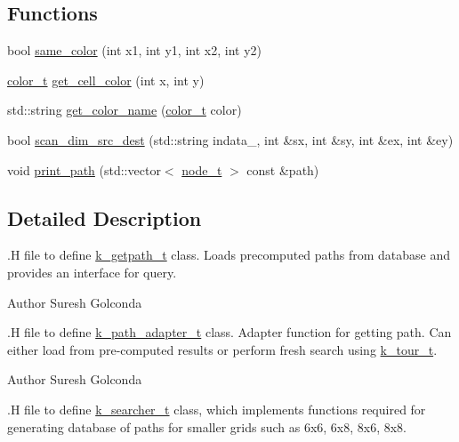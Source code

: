 \subsection*{\-Functions}
\begin{DoxyCompactItemize}
\item 
bool \hyperlink{namespaceknight__path__t_a43c9781d6e418e7a744ca04c5b1ee4c8}{same\-\_\-color} (int x1, int y1, int x2, int y2)
\item 
\hyperlink{namespaceknight__path__t_a0a9ffd13fa55164ea2147a92e4cf1d9d}{color\-\_\-t} \hyperlink{namespaceknight__path__t_a9f9a2b3586f04e4fb11b282d6ad9c3e5}{get\-\_\-cell\-\_\-color} (int x, int y)
\item 
std\-::string \hyperlink{namespaceknight__path__t_a7b62e81ce7b081406f94019c8863dc90}{get\-\_\-color\-\_\-name} (\hyperlink{namespaceknight__path__t_a0a9ffd13fa55164ea2147a92e4cf1d9d}{color\-\_\-t} color)
\item 
bool \hyperlink{namespaceknight__path__t_aae1cfdfd5ea3ff57eab91c245deaa25c}{scan\-\_\-dim\-\_\-src\-\_\-dest} (std\-::string indata\-\_\-, int \&sx, int \&sy, int \&ex, int \&ey)
\item 
void \hyperlink{namespaceknight__path__t_a38964814d6470650a9b5c8c26f3e401b}{print\-\_\-path} (std\-::vector$<$ \hyperlink{structknight__path__t_1_1node__t}{node\-\_\-t} $>$ const \&path)
\end{DoxyCompactItemize}


\subsection{\-Detailed \-Description}
.\-H file to define \hyperlink{classknight__path__t_1_1k__getpath__t}{k\-\_\-getpath\-\_\-t} class. \-Loads precomputed paths from database and provides an interface for query.

\begin{DoxyAuthor}{\-Author}
\-Suresh \-Golconda
\end{DoxyAuthor}
.\-H file to define \hyperlink{classknight__path__t_1_1k__path__adapter__t}{k\-\_\-path\-\_\-adapter\-\_\-t} class. \-Adapter function for getting path. \-Can either load from pre-\/computed results or perform fresh search using \hyperlink{classknight__path__t_1_1k__tour__t}{k\-\_\-tour\-\_\-t}.

\begin{DoxyAuthor}{\-Author}
\-Suresh \-Golconda
\end{DoxyAuthor}
.\-H file to define \hyperlink{classknight__path__t_1_1k__searcher__t}{k\-\_\-searcher\-\_\-t} class, which implements functions required for generating database of paths for smaller grids such as 6x6, 6x8, 8x6, 8x8.

